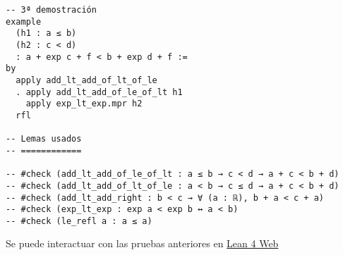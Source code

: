 \begin{verbatim}
-- 3ª demostración
example
  (h1 : a ≤ b)
  (h2 : c < d)
  : a + exp c + f < b + exp d + f :=
by
  apply add_lt_add_of_lt_of_le
  . apply add_lt_add_of_le_of_lt h1
    apply exp_lt_exp.mpr h2
  rfl

-- Lemas usados
-- ============

-- #check (add_lt_add_of_le_of_lt : a ≤ b → c < d → a + c < b + d)
-- #check (add_lt_add_of_lt_of_le : a < b → c ≤ d → a + c < b + d)
-- #check (add_lt_add_right : b < c → ∀ (a : ℝ), b + a < c + a)
-- #check (exp_lt_exp : exp a < exp b ↔ a < b)
-- #check (le_refl a : a ≤ a)
\end{verbatim}
Se puede interactuar con las pruebas anteriores en \href{https://lean.math.hhu.de/\#url=https://raw.githubusercontent.com/jaalonso/Calculemus2/main/src/Inecuaciones\_con\_exponenciales\_2.lean}{Lean 4 Web}

